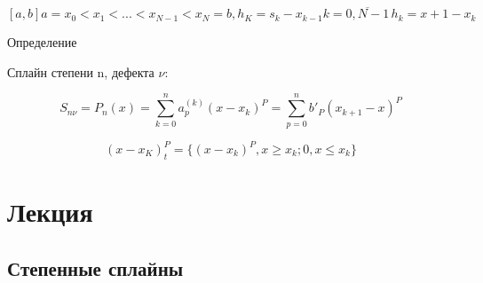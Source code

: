 \documentclass[12pt, a4paper]{article}
\begin{document}
\[ [a, b] a = x_0 < x_1 < ... < x_{N-1} < x_N = b, h_K = s_k - x_{k-1} k = \overline{0, N-1}\, h_k = x+1 - x_k\]

Определение

Сплайн степени n, дефекта $ \nu $:

\[ S_{n\nu} = P_n (x) = \sum_{k=0}^{n} a_p^(k) (x-x_k)^P = \sum_{p = 0}^{n} {b'}_P{(x_{k+1} - x)}^P \]

\[ (x - x_K)^P_t = \{ (x - x_k)^P, x \geq x_k; 0, x \leq x_k \} \]

\section{Лекция }

\subsection{Степенные сплайны}
\end{document}
